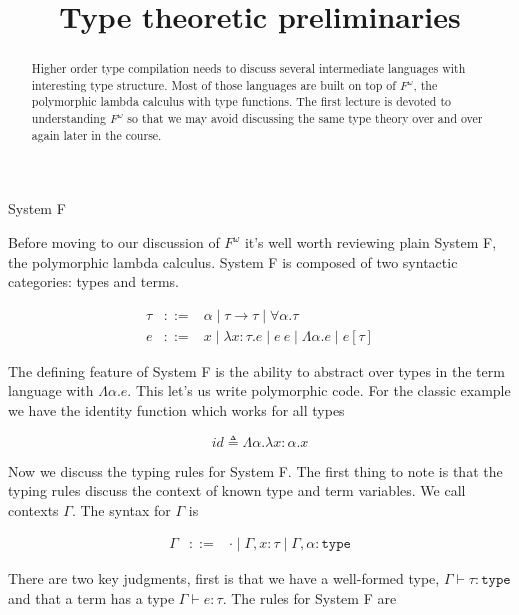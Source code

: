 \documentclass{amsart}
\title{Type theoretic preliminaries}
\newcommand{\type}{\ensuremath{\mathtt{type}}}
\begin{document}
\maketitle

\begin{abstract}
  Higher order type compilation needs to discuss several intermediate languages with interesting type structure. Most of those languages are built on top
  of $F^\omega$, the polymorphic lambda calculus with type
  functions. The first lecture is devoted to understanding $F^\omega$
  so that we may avoid discussing the same type theory over and over
  again later in the course.
\end{abstract}

\begin{section}{System F}

Before moving to our discussion of $F^\omega$ it's well worth
reviewing plain System F, the polymorphic lambda calculus. System F is
composed of two syntactic categories: types and terms.

\[
\begin{array}{lcl}
  \tau & ::= & \alpha \mid \tau \to \tau \mid \forall \alpha. \tau\\
  e & ::= & x \mid \lambda x : \tau. e \mid e\ e \mid
            \Lambda \alpha. e \mid e[\tau]
\end{array}
\]

The defining feature of System F is the ability to abstract over types
in the term language with $\Lambda \alpha. e$. This let's us write
polymorphic code. For the classic example we have the identity
function which works for all types

\[
  id \triangleq \Lambda \alpha. \lambda x : \alpha. x
\]

Now we discuss the typing rules for System F. The first thing to note
is that the typing rules discuss the context of known type and term
variables. We call contexts $\Gamma$. The syntax for $\Gamma$ is

\[
\begin{array}{lcl}
  \Gamma & ::= & \cdot \mid \Gamma, x : \tau \mid \Gamma, \alpha : \type
\end{array}
\]

There are two key
judgments, first is that we have a well-formed type, $\Gamma \vdash
\tau : \type$ and that a term has a type $\Gamma \vdash e : \tau$. The
rules for System F are


\end{section}
\end{document}
